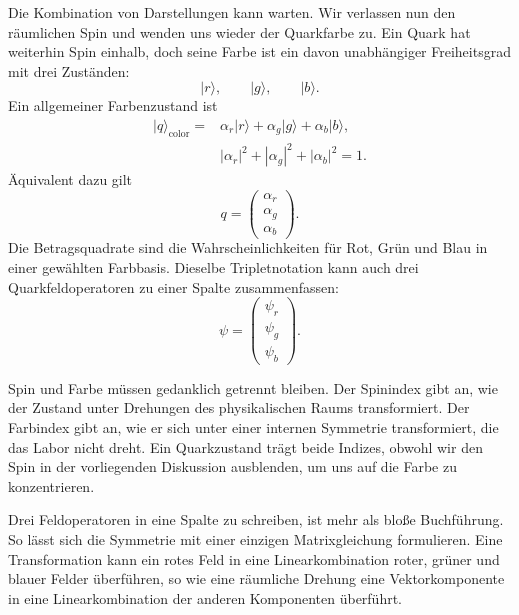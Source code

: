 Die Kombination von Darstellungen kann warten. Wir verlassen nun den räumlichen Spin und wenden uns wieder der Quarkfarbe zu. Ein Quark hat weiterhin Spin einhalb, doch seine Farbe ist ein davon unabhängiger Freiheitsgrad mit drei Zuständen:
\begin{equation}
\lvert r\rangle,\qquad
\lvert g\rangle,\qquad
\lvert b\rangle.
\end{equation}
Ein allgemeiner Farbenzustand ist
\begin{equation}
\begin{aligned}
\lvert q\rangle_{\mathrm{color}}
={}&
\alpha_r\lvert r\rangle
+\alpha_g\lvert g\rangle
+\alpha_b\lvert b\rangle,
\\
&|\alpha_r|^2+|\alpha_g|^2+|\alpha_b|^2=1.
\end{aligned}
\end{equation}
Äquivalent dazu gilt
\begin{equation}
q=
\begin{pmatrix}
\alpha_r\\
\alpha_g\\
\alpha_b
\end{pmatrix}.
\end{equation}
Die Betragsquadrate sind die Wahrscheinlichkeiten für Rot, Grün und Blau in einer gewählten Farbbasis. Dieselbe Tripletnotation kann auch drei Quarkfeldoperatoren zu einer Spalte zusammenfassen:
\begin{equation}
\psi=
\begin{pmatrix}
\psi_r\\
\psi_g\\
\psi_b
\end{pmatrix}.
\end{equation}

Spin und Farbe müssen gedanklich getrennt bleiben. Der Spinindex gibt an, wie der Zustand unter Drehungen des physikalischen Raums transformiert. Der Farbindex gibt an, wie er sich unter einer internen Symmetrie transformiert, die das Labor nicht dreht. Ein Quarkzustand trägt beide Indizes, obwohl wir den Spin in der vorliegenden Diskussion ausblenden, um uns auf die Farbe zu konzentrieren.

Drei Feldoperatoren in eine Spalte zu schreiben, ist mehr als bloße Buchführung. So lässt sich die Symmetrie mit einer einzigen Matrixgleichung formulieren. Eine Transformation kann ein rotes Feld in eine Linearkombination roter, grüner und blauer Felder überführen, so wie eine räumliche Drehung eine Vektorkomponente in eine Linearkombination der anderen Komponenten überführt.

